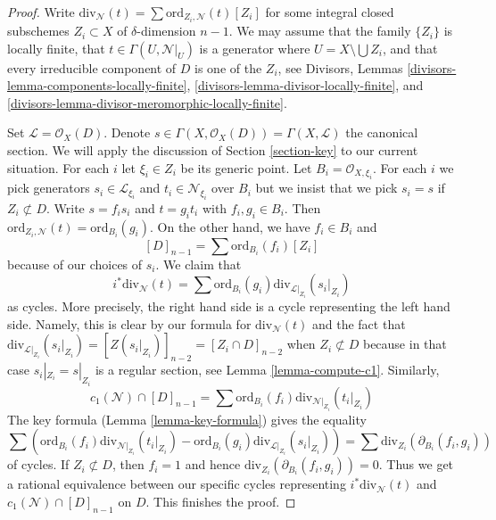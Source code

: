 \begin{proof}
Write $\text{div}_\mathcal{N}(t) = \sum \text{ord}_{Z_i, \mathcal{N}}(t)[Z_i]$
for some integral closed subschemes $Z_i \subset X$ of $\delta$-dimension
$n - 1$. We may assume that the family $\{Z_i\}$ is locally
finite, that $t \in \Gamma(U, \mathcal{N}|_U)$ is a generator
where $U = X \setminus \bigcup Z_i$, and that every irreducible component
of $D$ is one of the $Z_i$, see
Divisors, Lemmas \ref{divisors-lemma-components-locally-finite},
\ref{divisors-lemma-divisor-locally-finite}, and
\ref{divisors-lemma-divisor-meromorphic-locally-finite}.

\medskip\noindent
Set $\mathcal{L} = \mathcal{O}_X(D)$. Denote
$s \in \Gamma(X, \mathcal{O}_X(D)) = \Gamma(X, \mathcal{L})$
the canonical section. We will apply the discussion of
Section \ref{section-key} to our current situation.
For each $i$ let $\xi_i \in Z_i$ be its generic point. Let
$B_i = \mathcal{O}_{X, \xi_i}$. For each $i$ we pick generators
$s_i \in \mathcal{L}_{\xi_i}$ and $t_i \in \mathcal{N}_{\xi_i}$
over $B_i$ but we insist that we pick $s_i = s$ if $Z_i \not \subset D$.
Write $s = f_i s_i$ and $t = g_i t_i$ with $f_i, g_i \in B_i$.
Then $\text{ord}_{Z_i, \mathcal{N}}(t) = \text{ord}_{B_i}(g_i)$.
On the other hand, we have $f_i \in B_i$ and
$$
[D]_{n - 1} = \sum \text{ord}_{B_i}(f_i)[Z_i]
$$
because of our choices of $s_i$. We claim that
$$
i^*\text{div}_\mathcal{N}(t) =
\sum \text{ord}_{B_i}(g_i) \text{div}_{\mathcal{L}|_{Z_i}}(s_i|_{Z_i})
$$
as cycles. More precisely, the right hand side is a cycle
representing the left hand side. Namely, this is clear by our
formula for $\text{div}_\mathcal{N}(t)$ and the fact that
$\text{div}_{\mathcal{L}|_{Z_i}}(s_i|_{Z_i}) = [Z(s_i|_{Z_i})]_{n - 2} =
[Z_i \cap D]_{n - 2}$ when $Z_i \not \subset D$ because in
that case $s_i|_{Z_i} = s|_{Z_i}$ is a regular section, see
Lemma \ref{lemma-compute-c1}. Similarly,
$$
c_1(\mathcal{N}) \cap [D]_{n - 1} =
\sum \text{ord}_{B_i}(f_i) \text{div}_{\mathcal{N}|_{Z_i}}(t_i|_{Z_i})
$$
The key formula (Lemma \ref{lemma-key-formula}) gives the equality
$$
\sum \left(
\text{ord}_{B_i}(f_i) \text{div}_{\mathcal{N}|_{Z_i}}(t_i|_{Z_i}) -
\text{ord}_{B_i}(g_i) \text{div}_{\mathcal{L}|_{Z_i}}(s_i|_{Z_i}) \right) =
\sum \text{div}_{Z_i}(\partial_{B_i}(f_i, g_i))
$$
of cycles. If $Z_i \not \subset D$, then $f_i = 1$ and hence
$\text{div}_{Z_i}(\partial_{B_i}(f_i, g_i)) = 0$. Thus we get a rational
equivalence between our specific cycles representing
$i^*\text{div}_\mathcal{N}(t)$ and $c_1(\mathcal{N}) \cap [D]_{n - 1}$
on $D$. This finishes the proof.
\end{proof}

